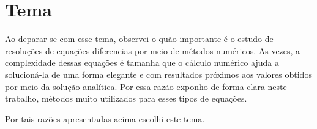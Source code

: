\section{Tema}\label{ltema}

Ao deparar-se com esse tema, observei o quão importante é o estudo de 
resoluções de equações diferencias por meio de métodos numéricos. As 
vezes, a complexidade dessas equações é tamanha que o cálculo numérico 
ajuda a solucioná-la de uma forma elegante e com resultados próximos 
aos valores obtidos por meio da solução analítica. Por essa razão 
exponho de forma clara neste trabalho, métodos muito utilizados 
para esses tipos de equações. 

Por tais razões apresentadas acima escolhi este tema.
